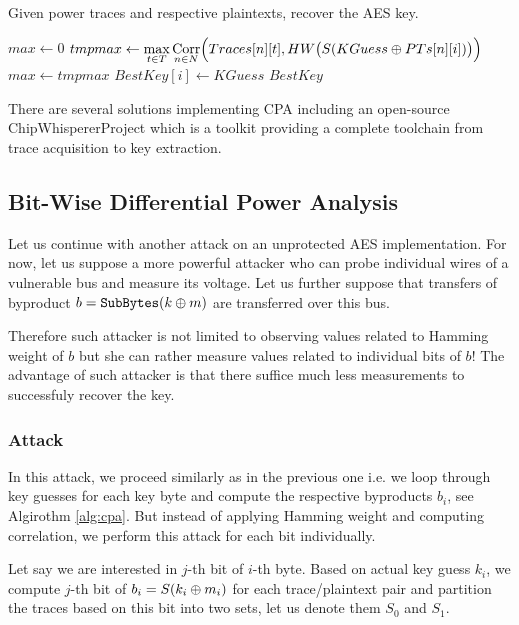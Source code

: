 \begin{alg}
\label{alg:cpa}
Given power traces and respective plaintexts, recover the AES key.
	\begin{algorithmic}[1]
				\State $max \gets 0$
					\State $tmpmax \gets \max\limits_{t\in T} \operatorname*{Corr}\limits_{n\in N}\Bigl(Traces[n][t], HW\bigl(S(KGuess\oplus PTs[n][i])\bigr)\Bigr)$
						\State $max \gets tmpmax$
						\State $BestKey[i] \gets KGuess$
					\EndIf
				\EndFor
			\EndFor
			\State\Return $BestKey$
		\EndFunction
	\end{algorithmic}
\end{alg}

There are several solutions implementing CPA including an open-source ChipWhisperer\texttrademark Project \cite{chipwhisperer} which is a toolkit providing a complete toolchain from trace acquisition to key extraction.

\subsection{Bit-Wise Differential Power Analysis}

Let us continue with another attack on an unprotected AES implementation. For now, let us suppose a more powerful attacker who can probe individual wires of a vulnerable bus and measure its voltage. Let us further suppose that transfers of byproduct $b = \texttt{SubBytes}(k\oplus m)$ are transferred over this bus.

Therefore such attacker is not limited to observing values related to Hamming weight of $b$ but she can rather measure values related to individual bits of $b$! The advantage of such attacker is that there suffice much less measurements to successfuly recover the key.

\subsubsection{Attack}

In this attack, we proceed similarly as in the previous one i.e. we loop through key guesses for each key byte and compute the respective byproducts $b_i$, see Algirothm \ref{alg:cpa}. But instead of applying Hamming weight and computing correlation, we perform this attack for each bit individually.

Let say we are interested in $j$-th bit of $i$-th byte. Based on actual key guess $k_i$, we compute $j$-th bit of $b_i = S(k_i\oplus m_i)$ for each trace/plaintext pair and partition the traces based on this bit into two sets, let us denote them $S_0$ and $S_1$.

